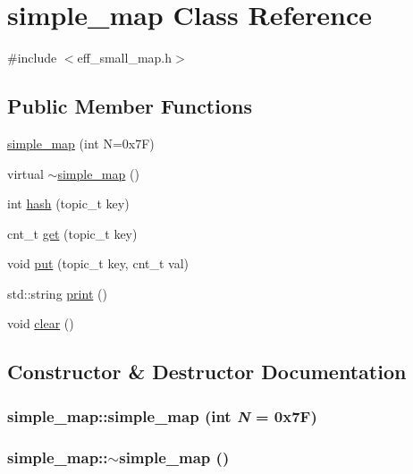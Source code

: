 \hypertarget{classsimple__map}{
\section{simple\_\-map Class Reference}
\label{classsimple__map}
}


{\ttfamily \#include $<$eff\_\-small\_\-map.h$>$}

\subsection*{Public Member Functions}
\begin{DoxyCompactItemize}
\item 
\hyperlink{classsimple__map_a08f7861e98479135574e3be707b0d716}{simple\_\-map} (int N=0x7F)
\item 
virtual \hyperlink{classsimple__map_ac74fd80a1fc54a2e00bba0773b9861c2}{$\sim$simple\_\-map} ()
\item 
int \hyperlink{classsimple__map_a5949e03ae87e5bd7413f2ce8b54b67a1}{hash} (topic\_\-t key)
\item 
cnt\_\-t \hyperlink{classsimple__map_a8b5d1ee44355470620c0812695eaf904}{get} (topic\_\-t key)
\item 
void \hyperlink{classsimple__map_a2a6492f6894ec804a21dc3c6f16faa86}{put} (topic\_\-t key, cnt\_\-t val)
\item 
std::string \hyperlink{classsimple__map_a1da12607eef1b029cef35ad01afeb149}{print} ()
\item 
void \hyperlink{classsimple__map_ab4821c5c690ae253c92f91cdc1e80e68}{clear} ()
\end{DoxyCompactItemize}


\subsection{Constructor \& Destructor Documentation}
\hypertarget{classsimple__map_a08f7861e98479135574e3be707b0d716}{
\subsubsection[{simple\_\-map}]{\setlength{\rightskip}{0pt plus 5cm}simple\_\-map::simple\_\-map (int {\em N} = {\ttfamily 0x7F})}}
\label{classsimple__map_a08f7861e98479135574e3be707b0d716}
\hypertarget{classsimple__map_ac74fd80a1fc54a2e00bba0773b9861c2}{
\subsubsection[{$\sim$simple\_\-map}]{\setlength{\rightskip}{0pt plus 5cm}simple\_\-map::$\sim$simple\_\-map ()}}
\label{classsimple__map_ac74fd80a1fc54a2e00bba0773b9861c2}



